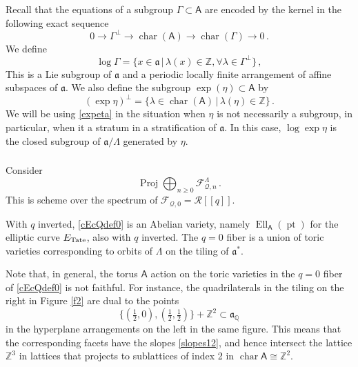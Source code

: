 \documentclass[14pt]{extarticle}
\newcommand{\Q}{\mathbb{Q}}
\newcommand{\Z}{\mathbb{Z}}
\newcommand{\bA}{\mathsf{A}}
\newcommand{\cR}{\mathscr{R}}
\newcommand{\cQ}{\mathscr{Q}}
\newcommand{\cF}{\mathscr{F}}
\newcommand{\fa}{\mathfrak{a}}
\DeclareMathOperator{\Ell}{Ell}
\DeclareMathOperator{\chr}{char}
\DeclareMathOperator{\pt}{pt}
\DeclareMathOperator{\Proj}{Proj}
\theoremstyle{definition}
\begin{document}
Recall that the equations of a subgroup
$\Gamma\subset \bA$  are encoded by the
kernel in the following exact
sequence
$$
0 \to \Gamma^\perp \to \chr(\bA) \to \chr(\Gamma) \to 0 \,. 
$$
We define
%
\begin{equation}
\log \Gamma = \{ x \in \fa \, | \, \lambda(x) \in \Z, \forall \lambda
\in \Gamma^\perp \}\,, \label{logGamma} 
\end{equation}
%
This is a Lie subgroup of $\fa$ and a 
periodic locally finite arrangement of affine subspaces of
$\fa$.
We also define the subgroup $\exp(\eta) \subset \bA$ by 
%
\begin{equation}
(\exp \eta)^\perp  = \{ \lambda \in \chr(\bA) \, | \, \lambda(\eta)
\in \Z
\}\,. \label{expeta} 
\end{equation}
%
We will be using \eqref{expeta} in the situation when $\eta$ is not
necessarily a subgroup, in particular, when it a stratum in a
stratification of $\fa$. In this case, $\log \exp \eta$ is the closed subgroup
of $\fa/\Lambda$ generated by $\eta$. 

\subsubsection{}\label{s_Gammaeta}

Consider 
%
\begin{equation}
\Proj \bigoplus_{n \ge 0} \cF_{\cQ,n}^{\Lambda}
\,.\label{cEcQdef0}
\end{equation}
%
This is scheme over the spectrum of  $\cF_{\cQ,0}=\cR[[q]]$.

With $q$
inverted, \eqref{cEcQdef0} is
an Abelian variety, namely $\Ell_\bA(\pt)$ for the 
elliptic curve $E_\textup{Tate}$, also with $q$ inverted. The $q=0$
fiber is a union of toric varieties corresponding to orbits of
$\Lambda$ on the tiling of $\fa^*$.


Note that, in general, the torus $\bA$ action on the 
toric varieties in the $q=0$ fiber of \eqref{cEcQdef0} is not faithful. For instance, the quadrilaterals in
the tiling on the right in Figure \ref{f2} are dual to the points
%
\begin{equation}
  \{(\tfrac12,0), (\tfrac12, \tfrac12) \} +\Z^2 \label{slopes12}
  \subset \fa_\Q 
\end{equation}
%
in the hyperplane arrangements on the left in the same figure. This 
means that the corresponding facets have the slopes
\eqref{slopes12},
and hence
intersect the lattice $\Z^3$ in lattices that projects to sublattices
of index 2 in $\chr \bA \cong \Z^2$.
\end{document}
